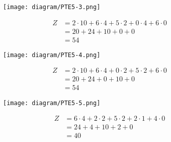 \documentclass{templateNote}
\begin{document}
\begin{figure}[H]
    \centering
    \texttt{[image: diagram/PTE5-3.png]}
\end{figure}
\begin{align*}
    Z &= 2 \cdot 10 + 6 \cdot 4 + 5 \cdot 2 + 0 \cdot 4 + 6 \cdot 0 \\
    &= 20 + 24 + 10 + 0 + 0 \\
    &=  54
\end{align*}

\begin{figure}[H]
    \centering
    \texttt{[image: diagram/PTE5-4.png]}
\end{figure}
\begin{align*}
    Z &= 2 \cdot 10 + 6 \cdot 4 + 0 \cdot 2 + 5 \cdot 2 + 6 \cdot 0 \\
    &= 20 + 24 + 0 + 10 + 0 \\
    &=  54
\end{align*}
\begin{figure}[H]
    \centering
    \texttt{[image: diagram/PTE5-5.png]}
\end{figure}
\begin{align*}
    Z &= 6 \cdot 4 + 2 \cdot 2 + 5 \cdot 2 + 2 \cdot 1 + 4 \cdot 0 \\
    &= 24 + 4 + 10 + 2 + 0 \\
    &=  40
\end{align*}
\end{document}
